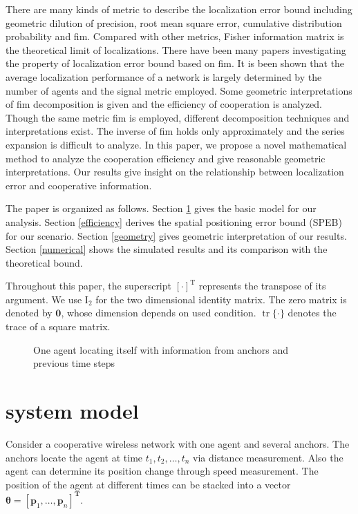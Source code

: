 \documentclass[conference]{IEEEtran}
\DeclareMathOperator\tr{tr}
\begin{document}
There are many kinds of metric to describe the localization error bound 
including geometric dilution of precision\cite{6237577}, root mean square error, 
cumulative distribution probability and \ac{fim}. 
Compared with other metrics, Fisher information matrix is the theoretical limit of localizations\cite{LimitBound2}. 
There have been many papers investigating the property of localization error bound based on \ac{fim}. 
It is been shown that the average localization performance of a network is largely determined by the number of agents and the signal metric employed\cite{7887727}. 
Some geometric interpretations of \ac{fim} decomposition is given and the efficiency of cooperation is analyzed\cite{7962761}. 
Though the same metric \ac{fim} is employed, different decomposition techniques and interpretations exist. 
The inverse of \ac{fim} holds only approximately\cite{7887727} 
and the series expansion is difficult  to analyze\cite{7962761}. In this paper, 
we propose a novel mathematical method to analyze the cooperation efficiency and give reasonable geometric interpretations. 
Our results give insight on the relationship between localization error and cooperative information. 

The paper is organized as follows. Section \ref{systemModel} gives the basic model for our analysis. 
Section \ref{efficiency} derives the spatial positioning error bound (SPEB) for our scenario. 
Section \ref{geometry} gives geometric interpretation of our results. 
Section \ref{numerical} shows the simulated results and its comparison with the theoretical bound.

Throughout this paper, the superscript $[\cdot]^{\mathrm{T}}$ represents the transpose of its argument. 
We use $\bm{\mathrm{I}}_2$ for the two dimensional identity matrix. The zero matrix is denoted by $\bm{0}$, 
whose dimension depends on used condition. $\tr\{\cdot\}$ 
denotes the trace of a square matrix.
\begin{figure}
  \centering
\def\svgwidth{7cm}

\caption{One agent locating itself with information from anchors and previous time steps}
\label{f1}
\end{figure}
\section{system model}\label{systemModel}
Consider a cooperative wireless network with one agent and several anchors. The anchors locate the agent at time $t_1,t_2,\dots,t_n$ via distance measurement. Also the agent can determine its position change through speed measurement. The position of the agent at different times can be stacked into a vector $\bm{\theta}=[\bm{p}_1,\dots,\bm{p}_n]^{\mathbf{T}}$.
\end{document}

